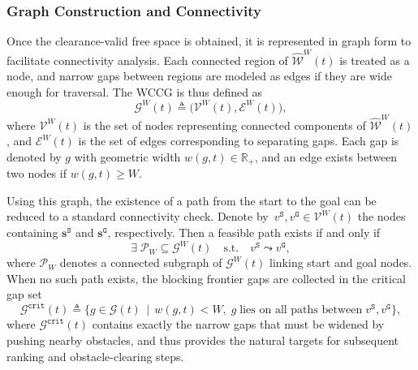 \subsubsection{Graph Construction and Connectivity}
\label{subsubsec:wccg-construction}
Once the clearance-valid free space is obtained, it is represented in
graph form to facilitate connectivity analysis. Each connected region of
$\widehat{\mathcal{W}}^{W}(t)$ is treated as a node, and narrow gaps between
regions are modeled as edges if they are wide enough for traversal. The
WCCG is thus defined as
\begin{equation}\label{eq:wccg-def}
  \mathcal{G}^{W}(t)\triangleq \big(\mathcal{V}^{W}(t),\mathcal{E}^{W}(t)\big),
\end{equation}
where $\mathcal{V}^{W}(t)$ is the set of nodes representing connected
components of $\widehat{\mathcal{W}}^{W}(t)$, and $\mathcal{E}^{W}(t)$ is
the set of edges corresponding to separating gaps. Each gap is denoted
by $g$ with geometric width $w(g,t)\in\mathbb{R}_{+}$, and an edge exists
between two nodes if $w(g,t)\geq W$.

Using this graph, the existence of a path from the start to the goal can be
reduced to a standard connectivity check. Denote by~$v^{\texttt{S}}, v^{\texttt{G}}\in\mathcal{V}^{W}(t)$
the nodes containing $\mathbf{s}^{\texttt{S}}$ and $\mathbf{s}^{\texttt{G}}$, respectively.
Then a feasible path exists if and only if
\begin{equation}\label{eq:wccg-path}
  \exists \;\mathcal{P}_{W}\subseteq\mathcal{G}^{W}(t)
  \quad \text{s.t.}\quad v^{\texttt{S}}\leadsto v^{\texttt{G}},
\end{equation}
where $\mathcal{P}_{W}$ denotes a connected subgraph of $\mathcal{G}^{W}(t)$
linking start and goal nodes. When no such path exists, the blocking frontier
gaps are collected in the critical gap set
\begin{equation}\label{eq:critical-gaps}
  \mathcal{G}^{\texttt{crit}}(t)\triangleq
  \{g\in\mathcal{G}(t)\,\mid\,w(g,t)<W,\;
  g\;\text{lies on all paths between}\;v^{\texttt{S}},v^{\texttt{G}}\},
\end{equation}
where $\mathcal{G}^{\texttt{crit}}(t)$ contains exactly the narrow gaps that
must be widened by pushing nearby obstacles, and thus provides the natural
targets for subsequent ranking and obstacle-clearing steps.
